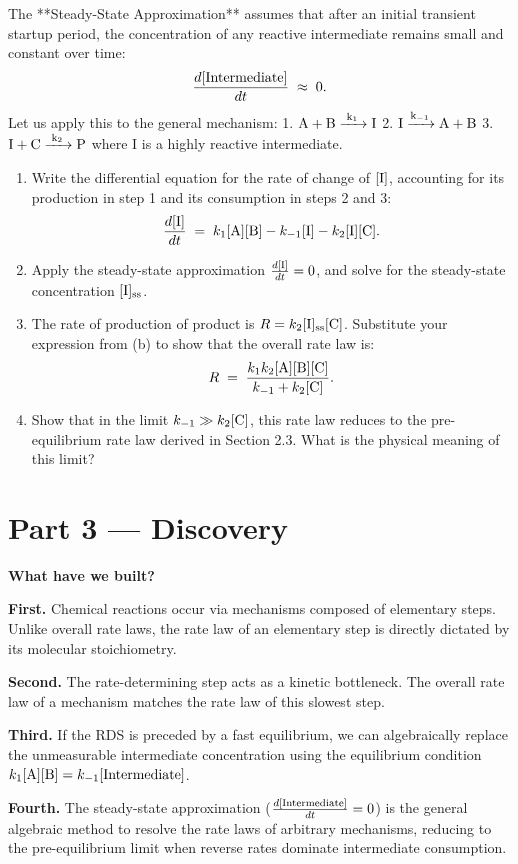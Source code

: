 \documentclass[12pt, a4paper]{book}
\begin{document}
\begin{explobox}
The **Steady-State Approximation** assumes that after an initial transient startup period, the concentration of any reactive intermediate remains small and constant over time:
\[
  \frac{d[\ce{Intermediate}]}{dt} \;\approx\; 0.
\]
\problem Let us apply this to the general mechanism:
1. $\ce{A + B ->[k_1] I}$
2. $\ce{I ->[k_{-1}] A + B}$
3. $\ce{I + C ->[k_2] P}$
where I is a highly reactive intermediate.
\begin{enumerate}[label=(\alph*), leftmargin=*]
  \item Write the differential equation for the rate of change of $[\ce{I}]$, accounting for its production in step 1 and its consumption in steps 2 and 3:
  \[
    \frac{d[\ce{I}]}{dt} \;=\; k_1 [\ce{A}][\ce{B}] - k_{-1} [\ce{I}] - k_2 [\ce{I}][\ce{C}].
  \]
  \item Apply the steady-state approximation $\frac{d[\ce{I}]}{dt} = 0$, and solve for the steady-state concentration $[\ce{I}]_{\text{ss}}$.
  \item The rate of production of product is $R = k_2 [\ce{I}]_{\text{ss}} [\ce{C}]$. Substitute your expression from (b) to show that the overall rate law is:
  \[
    R \;=\; \frac{k_1 k_2 [\ce{A}][\ce{B}][\ce{C}]}{k_{-1} + k_2 [\ce{C}]}.
  \]
  \item Show that in the limit $k_{-1} \gg k_2 [\ce{C}]$, this rate law reduces to the pre-equilibrium rate law derived in Section 2.3. What is the physical meaning of this limit?
\end{enumerate}
\end{explobox}

\newpage

\section{Part 3 --- Discovery}

\begin{discoverybox}
\textbf{What have we built?}

\textbf{First.} Chemical reactions occur via mechanisms composed of elementary steps. Unlike overall rate laws, the rate law of an elementary step is directly dictated by its molecular stoichiometry.

\textbf{Second.} The rate-determining step acts as a kinetic bottleneck. The overall rate law of a mechanism matches the rate law of this slowest step.

\textbf{Third.} If the RDS is preceded by a fast equilibrium, we can algebraically replace the unmeasurable intermediate concentration using the equilibrium condition $k_1[\ce{A}][\ce{B}] = k_{-1}[\ce{Intermediate}]$.

\textbf{Fourth.} The steady-state approximation ($\frac{d[\ce{Intermediate}]}{dt} = 0$) is the general algebraic method to resolve the rate laws of arbitrary mechanisms, reducing to the pre-equilibrium limit when reverse rates dominate intermediate consumption.
\end{discoverybox}
\end{document}
